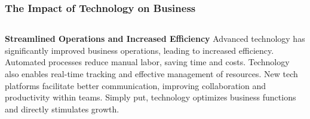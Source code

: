 \documentclass[5pt]{beamer}
\begin{document}
\begin{frame}
\frametitle{The Impact of Technology on Business}
\begin{columns}
\begin{column}{0.7\textwidth}
\begin{block}{\textbf{Streamlined Operations and Increased Efficiency}}
Advanced technology has significantly improved business operations, leading to increased efficiency. Automated processes reduce manual labor, saving time and costs. Technology also enables real-time tracking and effective management of resources. New tech platforms facilitate better communication, improving collaboration and productivity within teams. Simply put, technology optimizes business functions and directly stimulates growth.
\end{block}
\end{column}
\end{columns}
\end{frame}
\end{document}
